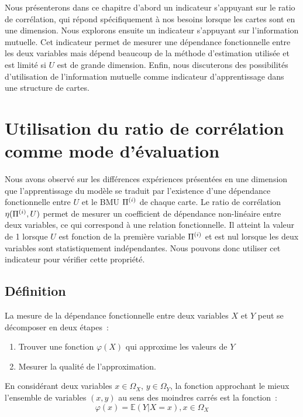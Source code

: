 \documentclass[../main]{subfiles}
\begin{document}
Nous présenterons dans ce chapitre d'abord un indicateur s'appuyant sur le ratio de corrélation, qui répond spécifiquement à nos besoins lorsque les cartes sont en une dimension. 
Nous explorons ensuite un indicateur s'appuyant sur l'information mutuelle.
Cet indicateur permet de mesurer une dépendance fonctionnelle entre les deux variables mais dépend beaucoup de la méthode d'estimation utilisée et est limité si $U$ est de grande dimension. Enfin, nous discuterons des possibilités d'utilisation de l'information mutuelle comme indicateur d'apprentissage dans une structure de cartes.

\section{Utilisation du ratio de corrélation comme mode d'évaluation}

Nous avons observé sur les différences expériences présentées en une dimension que l'apprentissage du modèle se traduit par l'existence d'une dépendance fonctionnelle entre $U$ et le BMU $\Pi^{({i})}$ de chaque carte.
Le ratio de corrélation $\eta(\Pi^{({i})},U)$ permet de mesurer un coefficient de dépendance non-linéaire entre deux variables, ce qui correspond à une relation fonctionnelle. Il atteint la valeur de 1 lorsque $U$ est fonction de la première variable $\Pi^{({i})}$ et est nul lorsque les deux variables sont statistiquement indépendantes. Nous pouvons donc utiliser cet indicateur pour vérifier cette propriété.

\subsection{Définition}

La mesure de la dépendance fonctionnelle entre deux variables $X$ et $Y$ peut se décomposer en deux étapes~:
\begin{enumerate}
    \item Trouver une fonction $\varphi(X)$ qui approxime les valeurs de $Y$
    \item Mesurer la qualité de l'approximation.
\end{enumerate}

En considérant deux variables $x \in \Omega_X$, $y \in \Omega_Y$, la fonction approchant le mieux l'ensemble de variables $(x,y)$ au sens des moindres carrés est la fonction~:
\begin{equation}
    \varphi(x) = \mathbb{E}(Y|X = x), x \in \Omega_X
\end{equation}
\end{document}
